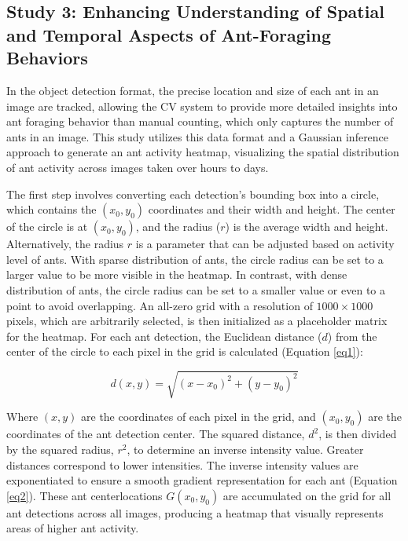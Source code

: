 \subsection{Study 3: Enhancing Understanding of Spatial and Temporal Aspects of Ant-Foraging Behaviors}

In the object detection format, the precise location and size of each ant in an image are tracked, allowing the CV system to provide more detailed insights into ant foraging behavior than manual counting, which only captures the number of ants in an image. This study utilizes this data format and a Gaussian inference approach to generate an ant activity heatmap, visualizing the spatial distribution of ant activity across images taken over hours to days.

The first step involves converting each detection's bounding box into a circle, which contains the $(x_0, y_0)$ coordinates and their width and height. The center of the circle is at $(x_0, y_0)$, and the radius ($r$) is the average width and height. Alternatively, the radius $r$ is a parameter that can be adjusted based on activity level of ants. With sparse distribution of ants, the circle radius can be set to a larger value to be more visible in the heatmap. In contrast, with dense distribution of ants, the circle radius can be set to a smaller value or even to a point to avoid overlapping. An all-zero grid with a resolution of $1000 \times 1000$ pixels, which are arbitrarily selected, is then initialized as a placeholder matrix for the heatmap. For each ant detection, the Euclidean distance ($d$) from the center of the circle to each pixel in the grid is calculated (Equation \ref{eq1}):

\begin{equation}
d(x, y) = \sqrt{(x - x_0)^2 + (y - y_0)^2}
\label{eq1}
\end{equation}

Where $(x, y)$ are the coordinates of each pixel in the grid, and $(x_0, y_0)$ are the coordinates of the ant detection center. The squared distance, $d^2$, is then divided by the squared radius, $r^2$, to determine an inverse intensity value. Greater distances correspond to lower intensities. The inverse intensity values are exponentiated to ensure a smooth gradient representation for each ant (Equation \ref{eq2}). These ant centerlocations $G(x_0, y_0)$ are accumulated on the grid for all ant detections across all images, producing a heatmap that visually represents areas of higher ant activity.

